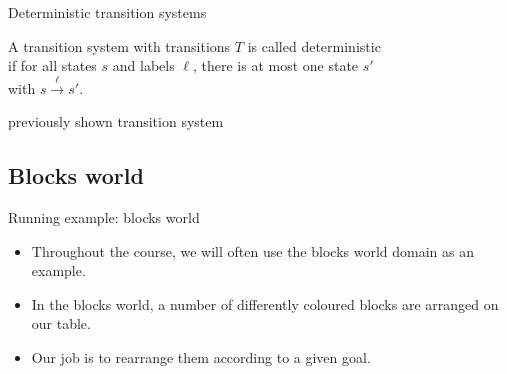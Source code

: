 \documentclass{gkibeamer}
\begin{document}
\begin{frame}{Deterministic transition systems}
  \begin{definition}
    A transition system with transitions $T$ is called
    \alert{deterministic} \\
    if for all states $s$ and labels $\ell$, there is \alert{at most one}
    state $s'$ \\
    with $s \xrightarrow{\ell} s'$.
  \end{definition}

   previously shown transition system
\end{frame}

\subsection{Blocks world}

\begin{frame}{Running example: blocks world}
  \begin{itemize}
  \item Throughout the course, we will often use the \alert{blocks
    world} domain as an example.
  \item In the blocks world, a number of differently coloured blocks
    are arranged on our table.
  \item Our job is to rearrange them according to a given goal.
  \end{itemize}
\end{frame}
\end{document}
